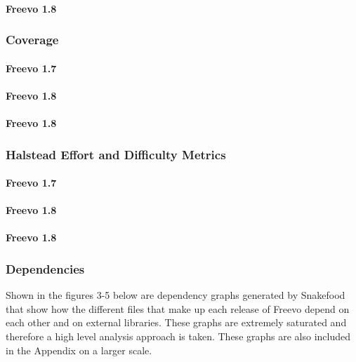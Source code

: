 \documentclass[10.5pt,journal, a4paper]{IEEEtran}
\begin{document}
\paragraph{Freevo 1.8}



\subsubsection{Coverage}

\paragraph{Freevo 1.7}


\paragraph{Freevo 1.8}


\paragraph{Freevo 1.8}





\subsubsection{Halstead Effort and Difficulty Metrics}

\paragraph{Freevo 1.7}


\paragraph{Freevo 1.8}


\paragraph{Freevo 1.8}



\subsubsection{Dependencies}
\noindent
Shown in the figures 3-5 below are dependency graphs generated by Snakefood that show how the different files that make up each release of Freevo depend on each other and on external libraries. These graphs are extremely saturated and therefore a high level analysis approach is taken. These graphs are also included in the Appendix on a larger scale. 
\end{document}
